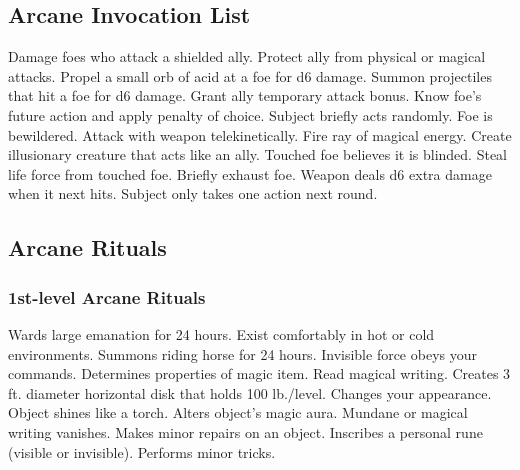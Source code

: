 \subsection{Arcane Invocation List}
\begin{swspelllist}
   Damage foes who attack a shielded ally.
   Protect ally from physical or magical attacks.
   Propel a small orb of acid at a foe for d6 damage.
   Summon projectiles that hit a foe for d6 damage.
   Grant ally temporary attack bonus.
   Know foe's future action and apply penalty of choice.
   Subject briefly acts randomly.
   Foe is bewildered.
   Attack with weapon telekinetically.
   Fire ray of magical energy.
   Create illusionary creature that acts like an ally.
   Touched foe believes it is blinded.
   Steal life force from touched foe.
   Briefly exhaust foe.
   Weapon deals d6 extra damage when it next hits.
   Subject only takes one action next round.
\end{swspelllist}

\subsection{Arcane Rituals}\label{Arcane Rituals}
\subsubsection{1st-level Arcane Rituals}
\begin{rituallist}
     Wards large emanation for 24 hours.
     Exist comfortably in hot or cold environments.
     Summons riding horse for 24 hours.
     Invisible force obeys your commands.
     Determines properties of magic item.
     Read magical writing.
     Creates 3 ft. diameter horizontal disk that holds 100 lb./level.
     Changes your appearance.
     Object shines like a torch.
     Alters object's magic aura.
     Mundane or magical writing vanishes.
     Makes minor repairs on an object.
     Inscribes a personal rune (visible or invisible).
     Performs minor tricks.
\end{rituallist}

